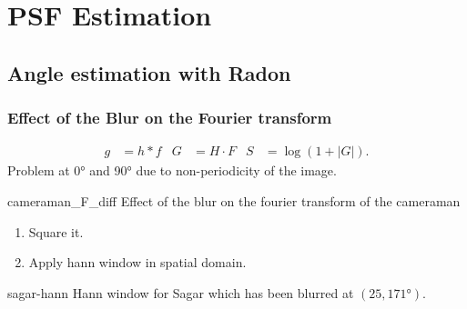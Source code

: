 \section[PSF Estimat.]{PSF Estimation}
\subsection{Angle estimation with Radon}
\begin{frame}[allowframebreaks]
  \frametitle{Effect of the Blur on the Fourier transform}
  \begin{align*}
    g & = h * f
    & G &= H \cdot F
    & S & = \log(1 + |G|).
  \end{align*}
  Problem at \ang{0} and \ang{90} due to non-periodicity of the image.
  \begin{myfig}{cameraman_F_diff}
    {Effect of the blur on the fourier transform of the cameraman}
  \end{myfig}

  \framebreak

  \begin{enumerate}
    \item Square it.
    \item Apply hann window in spatial domain.
  \end{enumerate}
  \begin{myfig}{sagar-hann}
    {Hann window for Sagar which has been blurred at $(25,\ang{171})$.}
  \end{myfig}
\end{frame}

